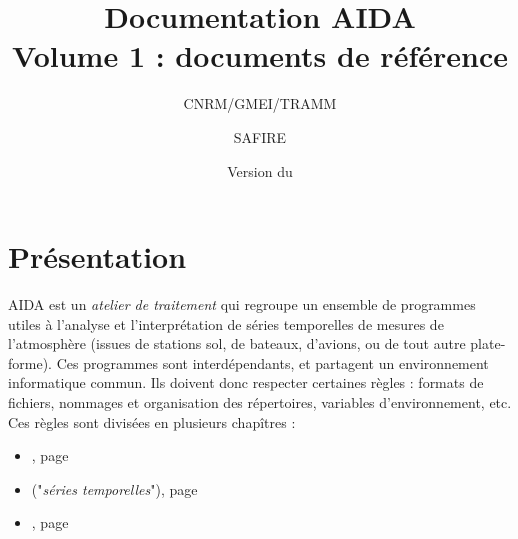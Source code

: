 \documentclass[a4paper,11pt]{article}
\title{Documentation AIDA \\Volume 1 : documents de référence}
\author{CNRM/GMEI/TRAMM \and SAFIRE}
\date{Version du \DTMusedate{gitdate}}
\begin{document}
\maketitle
\newpage

\tableofcontents
\newpage

\section*{Présentation}
	AIDA est un \emph{atelier de traitement}
qui regroupe un ensemble de programmes utiles à l'analyse et
l'interprétation de séries temporelles de mesures de l'atmosphère
(issues de stations sol, de bateaux, d'avions, ou de tout autre plate-forme).
 Ces programmes sont interdépendants, et partagent un environnement
informatique commun. Ils doivent donc respecter certaines 
règles : formats de fichiers, nommages et organisation des
répertoires, variables d'environnement, etc. Ces règles sont divisées en
plusieurs chapîtres :
\begin{itemize}
  \item {}, page \pageref{part:arbo}
  \item {} ("\textit{séries temporelles}"), page \pageref{part:formvec}
  \item {}, page \pageref{part:meta}
\end{itemize}








\end{document}
